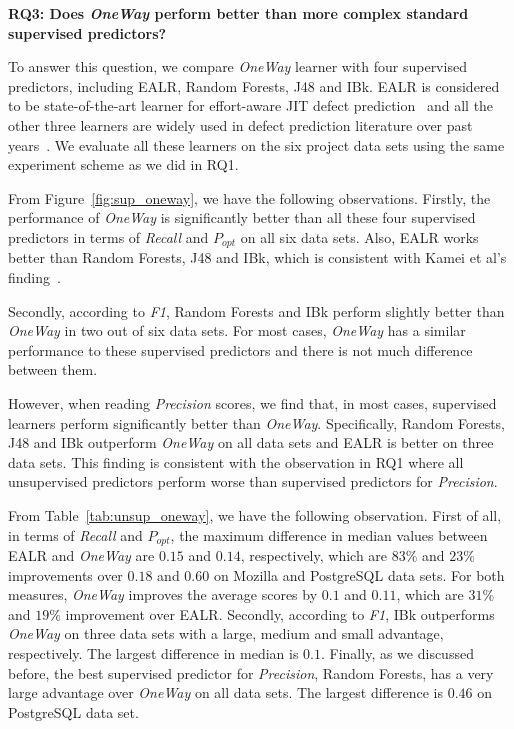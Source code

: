 \documentclass[sigconf]{acmart}
\theoremstyle{break}
\newcommand{\fig}[1]{Figure~\ref{fig:#1}}
\newcommand{\tab}[1]{Table~\ref{tab:#1}}
\begin{document}
\textbf{RQ3: Does {\it OneWay} perform  better than more complex standard supervised predictors?}

To answer this question, we compare {\it OneWay} learner with four
supervised predictors, including EALR, Random Forests, J48 and IBk. 
EALR is considered to be state-of-the-art learner for effort-aware
JIT defect prediction~\cite{yang2016effort,kamei2013large} and all the other three learners are widely used 
in defect prediction literature over past years~\cite{lessmann2008benchmarking,fu2016tuning,kamei2013large,fukushima2014empirical,turhan2009relative,hall2012systematic}. We evaluate all these
learners on the six project data 
sets using the same experiment scheme as we did in RQ1.


From \fig{sup_oneway}, we have the following observations. Firstly, 
the performance of {\it OneWay} is significantly better than all
these four supervised predictors in terms of {\it Recall} and ${P_{opt}}$
on all six data sets. Also, EALR works better than Random Forests, J48 and IBk,
which is consistent with Kamei et al's finding~\cite{kamei2013large}. 

Secondly,
according to {\it F1}, Random Forests and IBk perform slightly better than {\it OneWay}
in two out of six data sets. For most cases, {\it OneWay} has a similar performance
to these supervised predictors and there is not much difference between them.

However,
when reading {\it Precision} scores, we find that, in most cases, supervised
learners perform significantly better than {\it OneWay}. Specifically, Random Forests,
J48 and IBk outperform {\it OneWay} on all data sets and EALR is better on three data sets. 
This finding is consistent with the observation in RQ1 where all unsupervised predictors
perform worse than supervised predictors for {\it Precision}. 



From \tab{unsup_oneway},  we have the following observation.
First of all, in terms of {\it Recall} and ${P_{opt}}$, the maximum  difference in median values between 
EALR and {\it OneWay} are $0.15$ and $0.14$, respectively, which are $83\%$ and $23\%$ improvements over $0.18$ and $0.60$ on  Mozilla and PostgreSQL data sets.
For both measures, {\it OneWay} improves the average scores by $0.1$ and $0.11$, which are
$31\%$ and $19\%$ improvement over EALR. Secondly, according to {\it F1}, IBk outperforms
{\it OneWay}  on three data sets with a large, medium and small advantage, respectively.
The largest difference in median is $0.1$. Finally, as we discussed before, the best 
supervised predictor for {\it Precision}, Random Forests, has a very large advantage over
{\it OneWay} on all data sets. The largest difference is $0.46$ on PostgreSQL data set.
\end{document}
